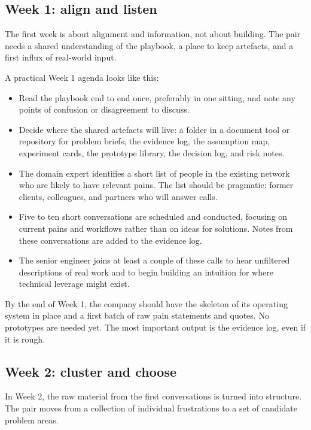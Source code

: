 \documentclass[10pt, a4paper, twocolumn]{article} %
\begin{document}
\subsection{Week 1: align and listen}

The first week is about alignment and information, not about building. The pair needs a shared understanding of the playbook, a place to keep artefacts, and a first influx of real-world input.

A practical Week 1 agenda looks like this:

\begin{itemize}
  \item Read the playbook end to end once, preferably in one sitting, and note any points of confusion or disagreement to discuss.
  \item Decide where the shared artefacts will live: a folder in a document tool or repository for problem briefs, the evidence log, the assumption map, experiment cards, the prototype library, the decision log, and risk notes.
  \item The domain expert identifies a short list of people in the existing network who are likely to have relevant pains. The list should be pragmatic: former clients, colleagues, and partners who will answer calls.
  \item Five to ten short conversations are scheduled and conducted, focusing on current pains and workflows rather than on ideas for solutions. Notes from these conversations are added to the evidence log.
  \item The senior engineer joins at least a couple of these calls to hear unfiltered descriptions of real work and to begin building an intuition for where technical leverage might exist.
\end{itemize}

By the end of Week 1, the company should have the skeleton of its operating system in place and a first batch of raw pain statements and quotes. No prototypes are needed yet. The most important output is the evidence log, even if it is rough.

\newpage
\subsection{Week 2: cluster and choose}

In Week 2, the raw material from the first conversations is turned into structure. The pair moves from a collection of individual frustrations to a set of candidate problem areas.
\end{document}
